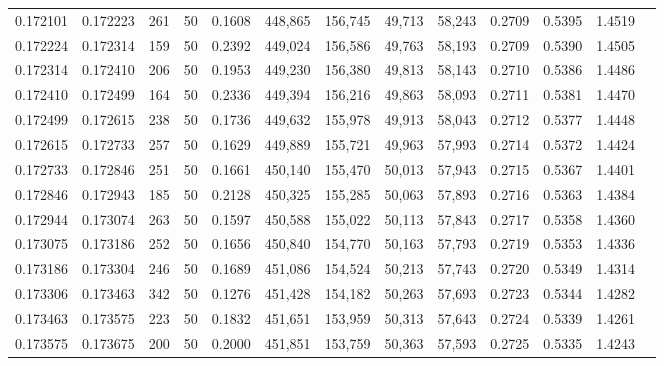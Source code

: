 \begin{tabular}{rrrrrrrrrrrrr}
0.172101 & 0.172223 &   261 &  50 &                                     0.1608 & 448,865 & 156,745 &  49,713 &  58,243 & 0.2709 & 0.5395 & 1.4519 \\
0.172224 & 0.172314 &   159 &  50 &                                     0.2392 & 449,024 & 156,586 &  49,763 &  58,193 & 0.2709 & 0.5390 & 1.4505 \\
0.172314 & 0.172410 &   206 &  50 &                                     0.1953 & 449,230 & 156,380 &  49,813 &  58,143 & 0.2710 & 0.5386 & 1.4486 \\
0.172410 & 0.172499 &   164 &  50 &                                     0.2336 & 449,394 & 156,216 &  49,863 &  58,093 & 0.2711 & 0.5381 & 1.4470 \\
0.172499 & 0.172615 &   238 &  50 &                                     0.1736 & 449,632 & 155,978 &  49,913 &  58,043 & 0.2712 & 0.5377 & 1.4448 \\
0.172615 & 0.172733 &   257 &  50 &                                     0.1629 & 449,889 & 155,721 &  49,963 &  57,993 & 0.2714 & 0.5372 & 1.4424 \\
0.172733 & 0.172846 &   251 &  50 &                                     0.1661 & 450,140 & 155,470 &  50,013 &  57,943 & 0.2715 & 0.5367 & 1.4401 \\
0.172846 & 0.172943 &   185 &  50 &                                     0.2128 & 450,325 & 155,285 &  50,063 &  57,893 & 0.2716 & 0.5363 & 1.4384 \\
0.172944 & 0.173074 &   263 &  50 &                                     0.1597 & 450,588 & 155,022 &  50,113 &  57,843 & 0.2717 & 0.5358 & 1.4360 \\
0.173075 & 0.173186 &   252 &  50 &                                     0.1656 & 450,840 & 154,770 &  50,163 &  57,793 & 0.2719 & 0.5353 & 1.4336 \\
0.173186 & 0.173304 &   246 &  50 &                                     0.1689 & 451,086 & 154,524 &  50,213 &  57,743 & 0.2720 & 0.5349 & 1.4314 \\
0.173306 & 0.173463 &   342 &  50 &                                     0.1276 & 451,428 & 154,182 &  50,263 &  57,693 & 0.2723 & 0.5344 & 1.4282 \\
0.173463 & 0.173575 &   223 &  50 &                                     0.1832 & 451,651 & 153,959 &  50,313 &  57,643 & 0.2724 & 0.5339 & 1.4261 \\
0.173575 & 0.173675 &   200 &  50 &                                     0.2000 & 451,851 & 153,759 &  50,363 &  57,593 & 0.2725 & 0.5335 & 1.4243 \\

\end{tabular}
